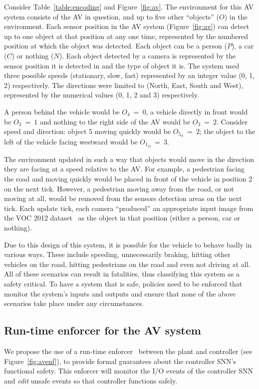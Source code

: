 Consider Table~\ref{table:encoding} and Figure~\ref{fig:av}.
The environment for this \ac{AV} system consists of the \ac{AV} in question, and up to five other ``objects'' ($O$) in the environment.
Each sensor position in the \ac{AV} system (Figure~\ref{fig:av}) can detect up to one object at that position at any one time, represented by the numbered position at which the object was detected.
Each object can be a person ($P$), a car ($C$) or nothing ($N$).
Each object detected by a camera is represented by the sensor position it is detected in and the type of object it is.
The system used three possible speeds (stationary, slow, fast) represented by an integer value (0, 1, 2) respectively.
The directions were limited to (North, East, South and West), represented by the numerical values (0, 1, 2 and 3) respectively.
\begin{example}
	A person behind the vehicle would be $O_{4}~=~0$, a vehicle directly in front would be $O_{2}~=~1$ and nothing to the right side of the \ac{AV} would be $O_{3}~=~2$.
	Consider speed and direction: object 5 moving quickly would be $O_{5_S}~=~2$; the object to the left of the vehicle facing westward would be $O_{1_D}~=~3$.
\end{example}

The environment updated in such a way that objects would move in the direction they are facing at a speed relative to the \ac{AV}.
For example, a pedestrian facing the road and moving quickly would be placed in front of the vehicle in position 2 on the next tick.
However, a pedestrian moving away from the road, or not moving at all, would be removed from the sensors detection areas on the next tick.
Each update tick, each camera ``produced'' an appropriate input image from the \ac{VOC} 2012 dataset~\cite{pascal-voc-2012} as the object in that position (either a person, car or nothing).

Due to this design of this system, it is possible for the vehicle to behave badly in various ways. 
These include speeding, unnecessarily braking, hitting other vehicles on the road, hitting pedestrians on the road and even not driving at all.
All of these scenarios can result in fatalities, thus classifying this system as a safety critical.
To have a system that is safe, policies need to be enforced that monitor the system's inputs and outputs and ensure that none of the above scenarios take place under any circumstances.

\subsection{Run-time enforcer for the \acf{AV} system}
We propose the use of a run-time enforcer~\cite{recps} between the plant and controller (see Figure~\ref{fig:avenf}), to provide formal guarantees about the controller \ac{SNN}'s functional safety.
This enforcer will monitor the I/O events of the controller \ac{SNN} and \textit{edit} unsafe events so that controller functions safely.

